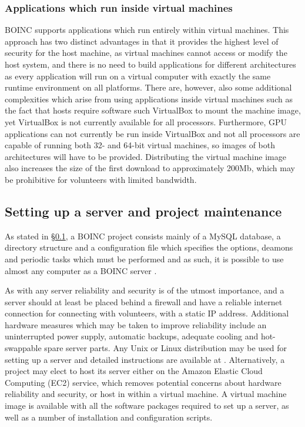 \subsubsection{Applications which run inside virtual machines}
BOINC supports applications which run entirely within virtual machines. This approach has two distinct advantages in that it provides the highest level of security for the host machine, as virtual machines cannot access or modify the host system, and there is no need to build applications for different architectures as every application will run on a virtual computer with exactly the same runtime environment on all platforms.  
There are, however, also some additional complexities which arise from using applications inside virtual machines such as the fact  that hosts require software such VirtualBox to mount the machine image, yet VirtualBox  is not currently available for all processors. Furthermore, GPU applications can not currently be run inside VirtualBox and not all processors are capable of running both 32- and 64-bit virtual machines, so images of both architectures will have to be provided. Distributing the virtual machine image also increases the size of the first download to approximately 200Mb, which may be prohibitive for volunteers with limited bandwidth.

\subsection{Setting up a server and project maintenance}
As stated in \S \ref{},   a BOINC project consists mainly of a MySQL database, a directory structure and a configuration file which specifies the options, deamons and periodic tasks which must be performed and as such, it is possible to use almost any computer as a  BOINC server \cite{boincwiki}.

As with any server reliability and security is of the utmost importance, and a server should at least be placed behind a firewall and have a reliable internet connection for connecting with volunteers, with a static IP address. Additional hardware measures which may  be taken to improve reliability  include an uninterrupted power supply, automatic backups, adequate cooling and hot-swappable spare server parts. Any Unix or Linux distribution may be used for setting up a server and  detailed instructions are available at \cite{boincwiki}. 
Alternatively, a project may elect to host its server either on the Amazon Elastic Cloud Computing (EC2) service, which removes   potential concerns about hardware reliability and security, or host in within a virtual machine. A virtual machine image is available with all the software packages required to set up a server, as well  as a number of installation and configuration scripts.  

